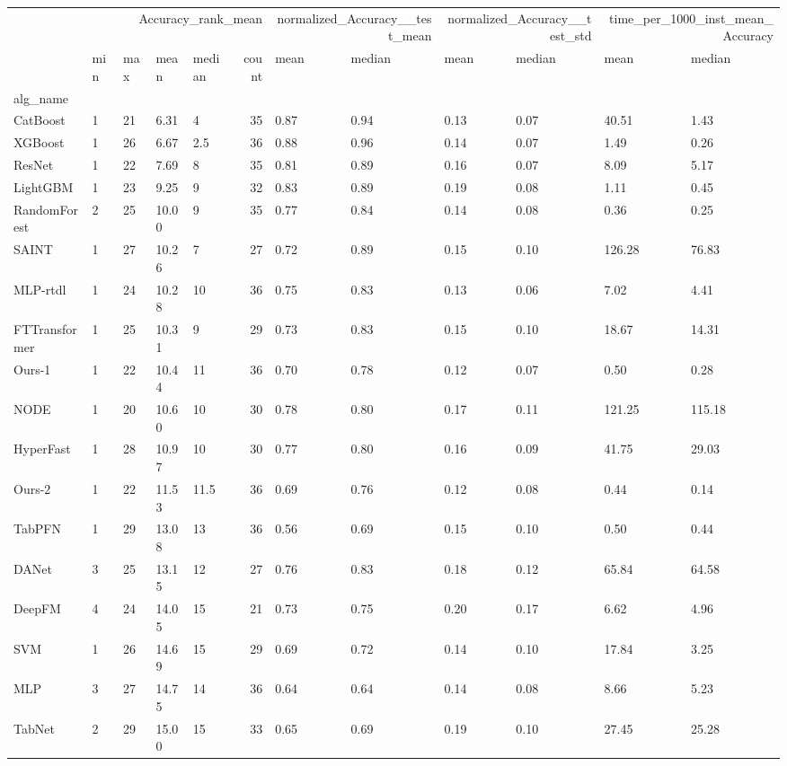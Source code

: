 \begin{tabular}{lllllrllllll}
\toprule
 & \multicolumn{5}{r}{Accuracy_rank_mean} & \multicolumn{2}{r}{normalized_Accuracy__test_mean} & \multicolumn{2}{r}{normalized_Accuracy__test_std} & \multicolumn{2}{r}{time_per_1000_inst_mean_Accuracy} \\
 & min & max & mean & median & count & mean & median & mean & median & mean & median \\
alg_name &  &  &  &  &  &  &  &  &  &  &  \\
\midrule
CatBoost & 1 & 21 & 6.31 & 4 & 35 & 0.87 & 0.94 & 0.13 & 0.07 & 40.51 & 1.43 \\
XGBoost & 1 & 26 & 6.67 & 2.5 & 36 & 0.88 & 0.96 & 0.14 & 0.07 & 1.49 & 0.26 \\
ResNet & 1 & 22 & 7.69 & 8 & 35 & 0.81 & 0.89 & 0.16 & 0.07 & 8.09 & 5.17 \\
LightGBM & 1 & 23 & 9.25 & 9 & 32 & 0.83 & 0.89 & 0.19 & 0.08 & 1.11 & 0.45 \\
RandomForest & 2 & 25 & 10.00 & 9 & 35 & 0.77 & 0.84 & 0.14 & 0.08 & 0.36 & 0.25 \\
SAINT & 1 & 27 & 10.26 & 7 & 27 & 0.72 & 0.89 & 0.15 & 0.10 & 126.28 & 76.83 \\
MLP-rtdl & 1 & 24 & 10.28 & 10 & 36 & 0.75 & 0.83 & 0.13 & 0.06 & 7.02 & 4.41 \\
FTTransformer & 1 & 25 & 10.31 & 9 & 29 & 0.73 & 0.83 & 0.15 & 0.10 & 18.67 & 14.31 \\
Ours-1 & 1 & 22 & 10.44 & 11 & 36 & 0.70 & 0.78 & 0.12 & 0.07 & 0.50 & 0.28 \\
NODE & 1 & 20 & 10.60 & 10 & 30 & 0.78 & 0.80 & 0.17 & 0.11 & 121.25 & 115.18 \\
HyperFast & 1 & 28 & 10.97 & 10 & 30 & 0.77 & 0.80 & 0.16 & 0.09 & 41.75 & 29.03 \\
Ours-2 & 1 & 22 & 11.53 & 11.5 & 36 & 0.69 & 0.76 & 0.12 & 0.08 & 0.44 & 0.14 \\
TabPFN & 1 & 29 & 13.08 & 13 & 36 & 0.56 & 0.69 & 0.15 & 0.10 & 0.50 & 0.44 \\
DANet & 3 & 25 & 13.15 & 12 & 27 & 0.76 & 0.83 & 0.18 & 0.12 & 65.84 & 64.58 \\
DeepFM & 4 & 24 & 14.05 & 15 & 21 & 0.73 & 0.75 & 0.20 & 0.17 & 6.62 & 4.96 \\
SVM & 1 & 26 & 14.69 & 15 & 29 & 0.69 & 0.72 & 0.14 & 0.10 & 17.84 & 3.25 \\
MLP & 3 & 27 & 14.75 & 14 & 36 & 0.64 & 0.64 & 0.14 & 0.08 & 8.66 & 5.23 \\
TabNet & 2 & 29 & 15.00 & 15 & 33 & 0.65 & 0.69 & 0.19 & 0.10 & 27.45 & 25.28 \\

\end{tabular}
